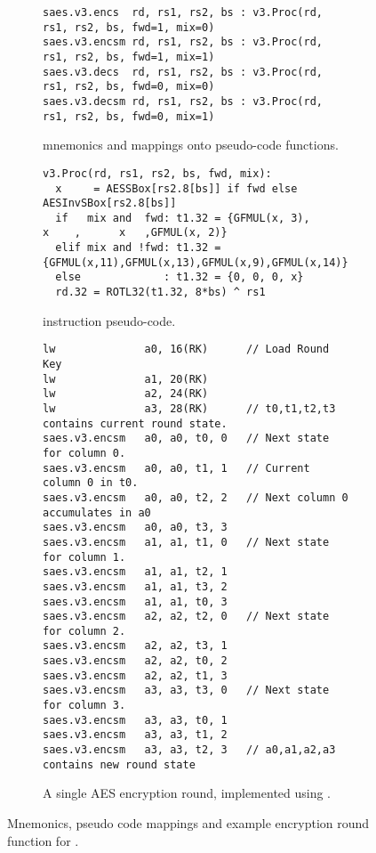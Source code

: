 
%


\begin{figure}[h]
\begin{subfigure}{\textwidth}
\begin{lstlisting}[language=pseudo,style=block]
saes.v3.encs  rd, rs1, rs2, bs : v3.Proc(rd, rs1, rs2, bs, fwd=1, mix=0)
saes.v3.encsm rd, rs1, rs2, bs : v3.Proc(rd, rs1, rs2, bs, fwd=1, mix=1)
saes.v3.decs  rd, rs1, rs2, bs : v3.Proc(rd, rs1, rs2, bs, fwd=0, mix=0)
saes.v3.decsm rd, rs1, rs2, bs : v3.Proc(rd, rs1, rs2, bs, fwd=0, mix=1)
\end{lstlisting}
\caption{
 mnemonics and mappings onto pseudo-code functions.
}
\label{fig:mnemonics:v3}
\end{subfigure}
\begin{subfigure}{\textwidth}
\begin{lstlisting}[language=pseudo,style=block]
v3.Proc(rd, rs1, rs2, bs, fwd, mix):
  x     = AESSBox[rs2.8[bs]] if fwd else AESInvSBox[rs2.8[bs]]
  if   mix and  fwd: t1.32 = {GFMUL(x, 3),      x    ,      x   ,GFMUL(x, 2)}
  elif mix and !fwd: t1.32 = {GFMUL(x,11),GFMUL(x,13),GFMUL(x,9),GFMUL(x,14)}
  else             : t1.32 = {0, 0, 0, x}
  rd.32 = ROTL32(t1.32, 8*bs) ^ rs1
\end{lstlisting}
\caption{
     instruction pseudo-code.
}
\label{fig:pseudo:v3}
\end{subfigure}
\begin{subfigure}{\textwidth}
\begin{lstlisting}[language=pseudo,style=block]
lw              a0, 16(RK)      // Load Round Key
lw              a1, 20(RK)
lw              a2, 24(RK)
lw              a3, 28(RK)      // t0,t1,t2,t3 contains current round state.
saes.v3.encsm   a0, a0, t0, 0   // Next state for column 0.
saes.v3.encsm   a0, a0, t1, 1   // Current column 0 in t0.
saes.v3.encsm   a0, a0, t2, 2   // Next column 0 accumulates in a0
saes.v3.encsm   a0, a0, t3, 3
saes.v3.encsm   a1, a1, t1, 0   // Next state for column 1.
saes.v3.encsm   a1, a1, t2, 1
saes.v3.encsm   a1, a1, t3, 2
saes.v3.encsm   a1, a1, t0, 3
saes.v3.encsm   a2, a2, t2, 0   // Next state for column 2.
saes.v3.encsm   a2, a2, t3, 1
saes.v3.encsm   a2, a2, t0, 2
saes.v3.encsm   a2, a2, t1, 3
saes.v3.encsm   a3, a3, t3, 0   // Next state for column 3.
saes.v3.encsm   a3, a3, t0, 1
saes.v3.encsm   a3, a3, t1, 2
saes.v3.encsm   a3, a3, t2, 3   // a0,a1,a2,a3 contains new round state
\end{lstlisting}
\caption{
A single AES encryption round, implemented using .
}
\label{fig:round:v3}
\end{subfigure}
\caption{
    Mnemonics, pseudo code mappings and example encryption
    round function for .
}
\end{figure}
